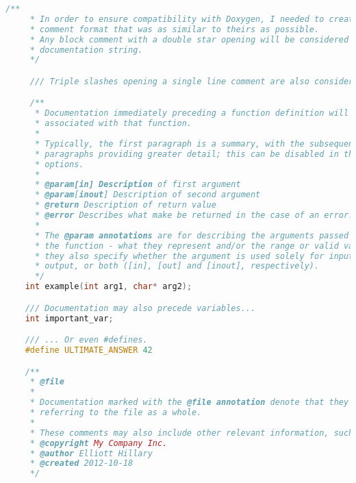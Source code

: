 \begin{lstlisting}[language=c]
    /**
     * In order to ensure compatibility with Doxygen, I needed to create a
     * comment format that was as similar to theirs as possible.
     * Any block comment with a double star opening will be considered for a
     * documentation string.
     */

     /// Triple slashes opening a single line comment are also considered.

     /**
      * Documentation immediately preceding a function definition will become
      * associated with that function.
      *
      * Typically, the first paragraph is a summary, with the subsequent
      * paragraphs providing greater detail; this can be disabled in the
      * options.
      *
      * @param[in] Description of first argument
      * @param[inout] Description of second argument
      * @return Description of return value
      * @error Describes what make be returned in the case of an error.
      *
      * The @param annotations are for describing the arguments passed into
      * the function - what they represent and/or the range or valid values -
      * they also specify whether the argument is used solely for input,
      * output, or both ([in], [out] and [inout], respectively).
      */
    int example(int arg1, char* arg2);

    /// Documentation may also precede variables...
    int important_var;

    /// ... Or even #defines.
    #define ULTIMATE_ANSWER 42

    /**
     * @file
     *
     * Documentation marked with the @file annotation denote that they are
     * referring to the file as a whole.
     *
     * These comments may also include other relevant information, such as:
     * @copyright My Company Inc.
     * @author Elliott Hillary
     * @created 2012-10-18
     */
\end{lstlisting}
